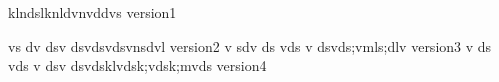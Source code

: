 klndslknldvnvddvs
version1

vs
dv
dsv
dsvdsvdsvnsdvl
version2
v
sdv
ds
vds
v
dsvds;vmls;dlv
version3
v
ds
vds
v
dsv
dsvdsklvdsk;vdsk;mvds
version4
